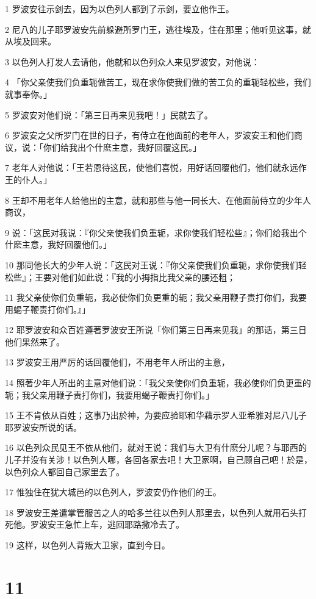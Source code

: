 \par 1 罗波安往示剑去，因为以色列人都到了示剑，要立他作王。
\par 2 尼八的儿子耶罗波安先前躲避所罗门王，逃往埃及，住在那里；他听见这事，就从埃及回来。
\par 3 以色列人打发人去请他，他就和以色列众人来见罗波安，对他说：
\par 4 「你父亲使我们负重轭做苦工，现在求你使我们做的苦工负的重轭轻松些，我们就事奉你。」
\par 5 罗波安对他们说：「第三日再来见我吧！」民就去了。
\par 6 罗波安之父所罗门在世的日子，有侍立在他面前的老年人，罗波安王和他们商议，说：「你们给我出个什麽主意，我好回覆这民。」
\par 7 老年人对他说：「王若恩待这民，使他们喜悦，用好话回覆他们，他们就永远作王的仆人。」
\par 8 王却不用老年人给他出的主意，就和那些与他一同长大、在他面前侍立的少年人商议，
\par 9 说：「这民对我说：『你父亲使我们负重轭，求你使我们轻松些』；你们给我出个什麽主意，我好回覆他们。」
\par 10 那同他长大的少年人说：「这民对王说：『你父亲使我们负重轭，求你使我们轻松些』；王要对他们如此说：『我的小拇指比我父亲的腰还粗；
\par 11 我父亲使你们负重轭，我必使你们负更重的轭；我父亲用鞭子责打你们，我要用蝎子鞭责打你们。』」
\par 12 耶罗波安和众百姓遵著罗波安王所说「你们第三日再来见我」的那话，第三日他们果然来了。
\par 13 罗波安王用严厉的话回覆他们，不用老年人所出的主意，
\par 14 照著少年人所出的主意对他们说：「我父亲使你们负重轭，我必使你们负更重的轭；我父亲用鞭子责打你们，我要用蝎子鞭责打你们。」
\par 15 王不肯依从百姓；这事乃出於神，为要应验耶和华藉示罗人亚希雅对尼八儿子耶罗波安所说的话。
\par 16 以色列众民见王不依从他们，就对王说：我们与大卫有什麽分儿呢？与耶西的儿子并没有关涉！以色列人哪，各回各家去吧！大卫家啊，自己顾自己吧！於是，以色列众人都回自己家里去了。
\par 17 惟独住在犹大城邑的以色列人，罗波安仍作他们的王。
\par 18 罗波安王差遣掌管服苦之人的哈多兰往以色列人那里去，以色列人就用石头打死他。罗波安王急忙上车，逃回耶路撒冷去了。
\par 19 这样，以色列人背叛大卫家，直到今日。

\chapter{11}

